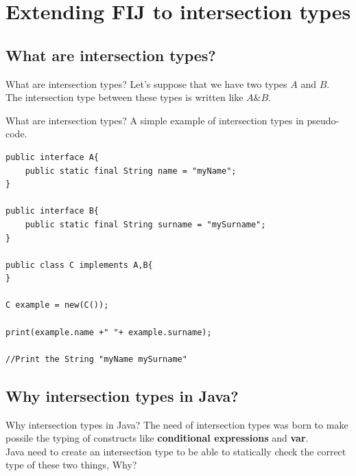 \documentclass{beamer}
\begin{document}
\section{Extending FIJ to intersection types}

\subsection{What are intersection types?}

\begin{frame}{What are intersection types?}
\boldmath
Let's suppose that we have two types $A$ and $B$.\\
The intersection type between these types is written like $A\&B$.\\
\end{frame}

\begin{frame}[fragile]{What are intersection types?}
\boldmath
A simple example of intersection types in pseudo-code.
\begin{flushleft}
\begin{lstlisting}[basicstyle=\scriptsize]
public interface A{
	public static final String name = "myName";
}

public interface B{
	public static final String surname = "mySurname";
}

public class C implements A,B{
}

C example = new(C());

print(example.name +" "+ example.surname);

//Print the String "myName mySurname"
\end{lstlisting}
\end{flushleft}
\end{frame}

\subsection{Why intersection types in Java?}
\begin{frame}{Why intersection types in Java?}
The need of intersection types was born to make possile the typing of constructs like \textbf{conditional expressions} and \textbf{var}.\\
Java need to create an intersection type to be able to statically check the correct type of these two things, Why?
\end{frame}
\end{document}
